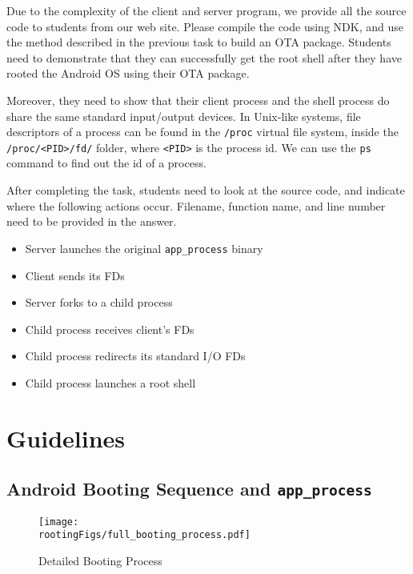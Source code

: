 Due to the complexity of the client and server program, we provide all the source code to
students from our web site. Please compile the code using NDK, and
use the method described in the previous task to build an OTA package. Students need to
demonstrate that they can successfully get the root shell after they have rooted the Android
OS using their OTA package. 


Moreover, they need to show that their client process and the shell process do share the same
standard input/output devices.  In Unix-like systems, file descriptors of a process can be found
in the \texttt{/proc} virtual file system, inside the \texttt{/proc/<PID>/fd/} folder, 
where \texttt{<PID>} is the process id. We can use the \texttt{ps} command to find out the
id of a process. 


After completing the task, students need to look at the source code, and indicate 
where the following actions occur. Filename, function name, and line number
need to be provided in the answer.

  
  \begin{itemize}
     \item Server launches the original \texttt{app\_process} binary
     \item Client sends its FDs
     \item Server forks to a child process
     \item Child process receives client's FDs
     \item Child process redirects its standard I/O FDs
     \item Child process launches a root shell
  \end{itemize}

 


\section{Guidelines}
\label{sec:rooting:guidelines}


\subsection{Android Booting Sequence and \texttt{app\_process}}
\label{sec:rooting:BootingSequence}


\begin{figure}[htb]
  \begin{center}
    \texttt{[image: \\rootingFigs/full\_booting\_process.pdf]}
  \end{center}
  \caption{Detailed Booting Process}
  \label{fig:rooting:bootingProcess}
\end{figure}

